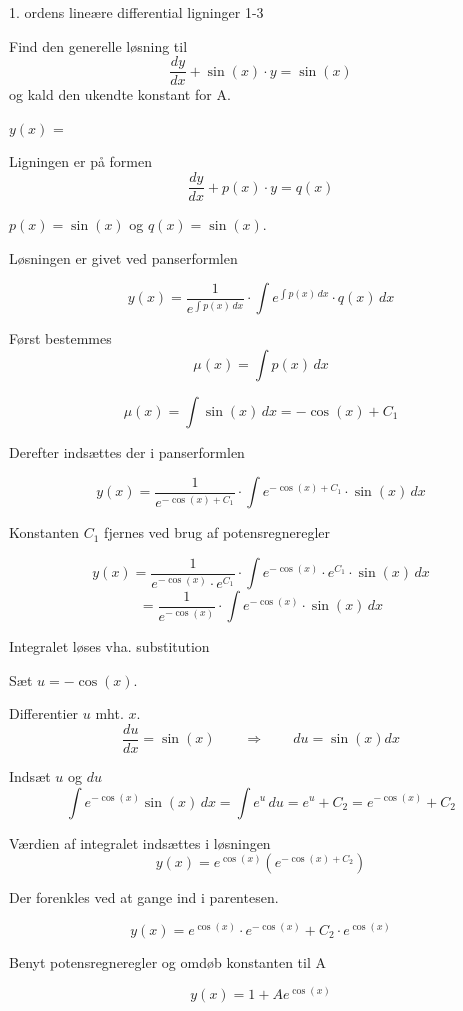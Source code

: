 \documentclass{article}
\begin{document}
\newpage

\begin{exercise}{1. ordens lineære differential ligninger 1-3}


Find den generelle løsning til
\[
\frac{dy}{dx} + \sin(x) \cdot y = \sin(x)
\]
og kald den ukendte konstant for A.

$y(x)$ = 



\hint

Ligningen er på formen
\[
\frac{dy}{dx} + p(x) \cdot y = q(x)
\]

\hint

$p(x)=\sin(x)$ og $q(x)=\sin(x)$.

\hint

Løsningen er givet ved panserformlen


\hint

\[
y(x) = \frac{1}{e^{\int p(x) \, dx}} \cdot \int e^{\int p(x) \, dx} \cdot q(x) \, dx
\]

\hint

Først bestemmes
\[
\mu(x) = \int p(x) \, dx
\]

\hint
\[
\mu(x) = \int \sin(x) \, dx = - \cos(x) + C_1
\]

\hint
Derefter indsættes der i panserformlen

\hint

\[
y(x) = \frac{1}{e^{ - \cos(x) + C_1}} \cdot \int e^{ - \cos(x) + C_1} \cdot \sin(x) \, dx
\]


\hint

Konstanten $C_1$ fjernes ved brug af potensregneregler

\hint
\[
y(x) = \frac{1}{e^{- \cos(x)} \cdot e^{C_1}} \cdot \int e^{ - \cos(x)} \cdot e^{C_1} \cdot \sin(x) \, dx
\]
\[
= \frac{1}{e^{ - \cos(x)}} \cdot \int e^{- \cos(x)} \cdot \sin(x) \, dx
\]

\hint

Integralet løses vha. substitution


\hint
Sæt $u = - \cos(x)$.

\hint

Differentier $u$ mht. $x$.
\[
\frac{du}{dx} = \sin(x) \qquad\Rightarrow \qquad du = \sin(x) dx
\]

\hint
Indsæt $u$ og $du$
\[
\int e^{- \cos(x)} \sin(x) \, dx = \int e^{u} \, du = e^{u} + C_2 = e^{- \cos(x)} + C_2
\]

\hint

Værdien af integralet indsættes i løsningen
\[
y(x) = e^{\cos(x)} \left( e^{- \cos(x) + C_2}\right)
\]

\hint

Der forenkles ved at gange ind i parentesen.

\hint
\[
y(x) = e^{\cos(x)} \cdot e^{- \cos(x)} + C_2 \cdot e^{\cos(x)}
\]

\hint

Benyt potensregneregler og omdøb konstanten til A

\hint
\[
y(x) = 1 + A e^{\cos(x)}
\]


\end{exercise}
\end{document}
